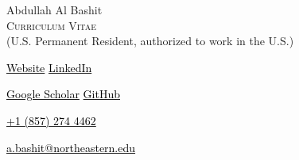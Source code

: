 \noindent
\begin{minipage}[t]{0.6\textwidth}
    {\fontsize{24}{38}\selectfont\color{burgundy}Abdullah Al Bashit}\\
    \vspace{0.3em}
    {\fontsize{14}{17}\selectfont\textsc{Curriculum Vitae}}\\[0.3em]
        {{(U.S. Permanent Resident, authorized to work in the U.S.)}}
\end{minipage}
\hfill
\begin{minipage}[t]{0.35\textwidth}
    \raggedleft
    {\color{burgundy}\faGlobe}  \href{https://abdullah-al-bashit.github.io/}{\textcolor{black}{Website}} {\color{burgundy}\faLinkedin} \href{https://www.linkedin.com/in/abdullah-al-bashit/}{\textcolor{black}{LinkedIn}}


    {\color{burgundy}\faGraduationCap}  \href{https://scholar.google.com/citations?user=w3KyQbkAAAAJ&hl=en}{\textcolor{black}{Google Scholar}} {\color{burgundy}\faGithub} \href{https://github.com/abdullah-al-bashit}{\textcolor{black}{GitHub}}
        
    {\color{burgundy}\faMobile*} \href{tel:+18572744462}{\textcolor{black}{+1 (857) 274 4462}}
    
    {\color{burgundy}\Letter} \href{mailto:a.bashit@northeastern.edu}{\textcolor{black}{a.bashit@northeastern.edu}}


\end{minipage}
